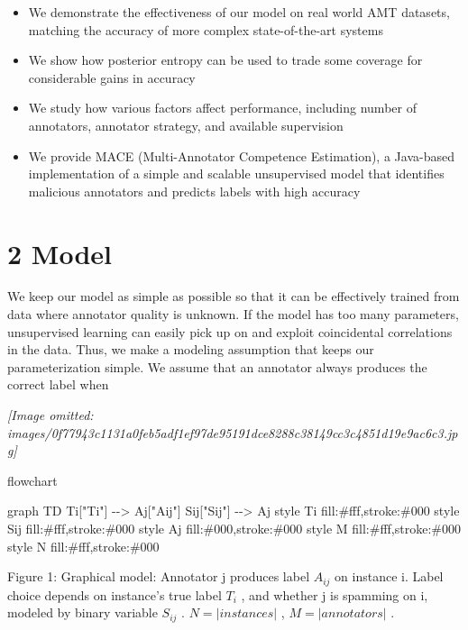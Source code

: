 \documentclass[
]{article}
\newenvironment{Shaded}{}{}
\newcommand{\NormalTok}[1]{#1}
\providecommand{\tightlist}{%
  \setlength{\itemsep}{0pt}\setlength{\parskip}{0pt}}
\begin{document}
\begin{itemize}
\tightlist
\item
  We demonstrate the effectiveness of our model on real world AMT
  datasets, matching the accuracy of more complex state-of-the-art
  systems\\
\item
  We show how posterior entropy can be used to trade some coverage for
  considerable gains in accuracy\\
\item
  We study how various factors affect performance, including number of
  annotators, annotator strategy, and available supervision\\
\item
  We provide MACE (Multi-Annotator Competence Estimation), a Java-based
  implementation of a simple and scalable unsupervised model that
  identifies malicious annotators and predicts labels with high accuracy
\end{itemize}

\section{2 Model}\label{model}

We keep our model as simple as possible so that it can be effectively
trained from data where annotator quality is unknown. If the model has
too many parameters, unsupervised learning can easily pick up on and
exploit coincidental correlations in the data. Thus, we make a modeling
assumption that keeps our parameterization simple. We assume that an
annotator always produces the correct label when

\textit{[Image omitted: images/0f77943c1131a0feb5adf1ef97de95191dce8288c38149cc3c4851d19e9ac6c3.jpg]}

flowchart

\begin{Shaded}
\begin{Highlighting}[]
\NormalTok{graph TD}
\NormalTok{    Ti["Ti"] {-}{-}\textgreater{} Aj["Aij"]}
\NormalTok{    Sij["Sij"] {-}{-}\textgreater{} Aj}
\NormalTok{    style Ti fill:\#fff,stroke:\#000}
\NormalTok{    style Sij fill:\#fff,stroke:\#000}
\NormalTok{    style Aj fill:\#000,stroke:\#000}
\NormalTok{    style M fill:\#fff,stroke:\#000}
\NormalTok{    style N fill:\#fff,stroke:\#000}
\end{Highlighting}
\end{Shaded}

Figure 1: Graphical model: Annotator j produces label \(A_{ij}\) on
instance i. Label choice depends on instance's true label \(T_{i}\) ,
and whether j is spamming on i, modeled by binary variable \(S_{ij}\) .
\(N = |instances|\) , \(M = |annotators|\) .
\end{document}
